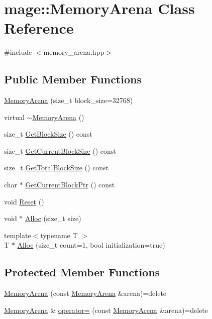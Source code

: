 \hypertarget{classmage_1_1_memory_arena}{}\section{mage\+:\+:Memory\+Arena Class Reference}
\label{classmage_1_1_memory_arena}


{\ttfamily \#include $<$memory\+\_\+arena.\+hpp$>$}

\subsection*{Public Member Functions}
\begin{DoxyCompactItemize}
\item 
\hyperlink{classmage_1_1_memory_arena_ac90beb8cf8dc42944a0fd6a4a9e8355c}{Memory\+Arena} (size\+\_\+t block\+\_\+size=32768)
\item 
virtual \hyperlink{classmage_1_1_memory_arena_a2bea1690184d21f54a4fb815a86e0c27}{$\sim$\+Memory\+Arena} ()
\item 
size\+\_\+t \hyperlink{classmage_1_1_memory_arena_a0db28bd286a517a30acdc061ace0bf56}{Get\+Block\+Size} () const
\item 
size\+\_\+t \hyperlink{classmage_1_1_memory_arena_a2789bf0c58dee881662bbb0c5ba73e55}{Get\+Current\+Block\+Size} () const
\item 
size\+\_\+t \hyperlink{classmage_1_1_memory_arena_ac4be7fb4d5623d6f78b1576c7884883a}{Get\+Total\+Block\+Size} () const
\item 
char $\ast$ \hyperlink{classmage_1_1_memory_arena_ac856206614ef9890d500df207d12e863}{Get\+Current\+Block\+Ptr} () const
\item 
void \hyperlink{classmage_1_1_memory_arena_a117b74c7bd5dfb28dfdaae6cab253491}{Reset} ()
\item 
void $\ast$ \hyperlink{classmage_1_1_memory_arena_a83f19bd85aea65001e6406075c105398}{Alloc} (size\+\_\+t size)
\item 
{\footnotesize template$<$typename T $>$ }\\T $\ast$ \hyperlink{classmage_1_1_memory_arena_ab249fe48cdf7c46f625050fe9583603a}{Alloc} (size\+\_\+t count=1, bool initialization=true)
\end{DoxyCompactItemize}
\subsection*{Protected Member Functions}
\begin{DoxyCompactItemize}
\item 
\hyperlink{classmage_1_1_memory_arena_a1eca6fdacbd1226f4b21f443d118168b}{Memory\+Arena} (const \hyperlink{classmage_1_1_memory_arena}{Memory\+Arena} \&arena)=delete
\item 
\hyperlink{classmage_1_1_memory_arena}{Memory\+Arena} \& \hyperlink{classmage_1_1_memory_arena_a7e7799f859c55435714933972ecb8b95}{operator=} (const \hyperlink{classmage_1_1_memory_arena}{Memory\+Arena} \&arena)=delete
\end{DoxyCompactItemize}
